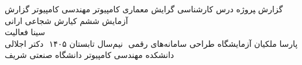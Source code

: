 ‫
‫%
‫%
‫%
‫
‫\newcommand{\ProjectReportType}
‫{ گزارش ‍‍‍‍‍پروژه درس} 
‫\newcommand{\StudentDegree}
‫{کارشناسی گرایش معماری کامپیوتر}  %
‫\newcommand{\CourseMajor}
‫{مهندسی کامپیوتر}  %
‫\newcommand{\CourseReportTitle}
‫{گزارش آزمایش ششم}
‫\newcommand{\GroupeMembers}
‫{کیارش شجاعی ارانی \\ سینا فعالیت \\ پارسا ملکیان}
‫\newcommand{\CourseName}
‫{آزمایشگاه طراحی سامانه‌های رقمی}
‫
‫\newcommand{\courseSemester}
‫{نیم‌سال تابستان ۱۴۰۵}
‫
‫\newcommand{\CourseProfessor}
‫{دکتر اجلالی}
‫\newcommand{\Department}
‫{دانشکده مهندسی کامپیوتر}
‫\newcommand{\University}
‫{دانشگاه صنعتی شریف}
‫
‫%
‫%
‫%
‫
‫